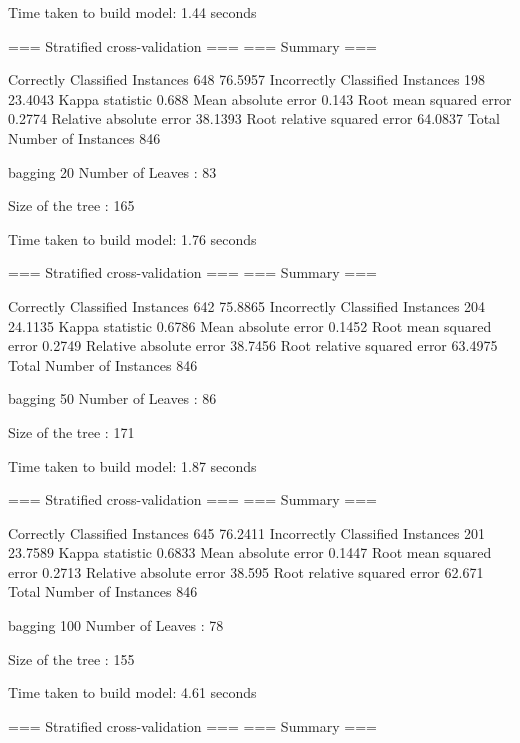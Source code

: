 Time taken to build model: 1.44 seconds

=== Stratified cross-validation ===
=== Summary ===

Correctly Classified Instances         648               76.5957 %
Incorrectly Classified Instances       198               23.4043 %
Kappa statistic                          0.688 
Mean absolute error                      0.143 
Root mean squared error                  0.2774
Relative absolute error                 38.1393 %
Root relative squared error             64.0837 %
Total Number of Instances              846

bagging 20
Number of Leaves  : 	83

Size of the tree : 	165




Time taken to build model: 1.76 seconds

=== Stratified cross-validation ===
=== Summary ===

Correctly Classified Instances         642               75.8865 %
Incorrectly Classified Instances       204               24.1135 %
Kappa statistic                          0.6786
Mean absolute error                      0.1452
Root mean squared error                  0.2749
Relative absolute error                 38.7456 %
Root relative squared error             63.4975 %
Total Number of Instances              846

bagging 50
Number of Leaves  : 	86

Size of the tree : 	171




Time taken to build model: 1.87 seconds

=== Stratified cross-validation ===
=== Summary ===

Correctly Classified Instances         645               76.2411 %
Incorrectly Classified Instances       201               23.7589 %
Kappa statistic                          0.6833
Mean absolute error                      0.1447
Root mean squared error                  0.2713
Relative absolute error                 38.595  %
Root relative squared error             62.671  %
Total Number of Instances              846

bagging 100
Number of Leaves  : 	78

Size of the tree : 	155




Time taken to build model: 4.61 seconds

=== Stratified cross-validation ===
=== Summary ===

